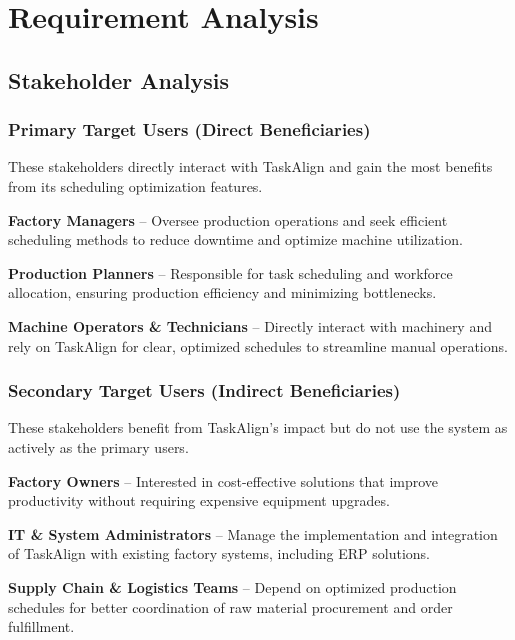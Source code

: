 \chapter{Requirement Analysis}
\label{chap:requirement-analysis}

\section{Stakeholder Analysis}
\label{section:stakeholder-analysis}


\subsection{Primary Target Users (Direct Beneficiaries)}
These stakeholders directly interact with TaskAlign and gain the most benefits from its scheduling optimization features.

\textbf{Factory Managers} – Oversee production operations and seek efficient scheduling methods to reduce downtime and optimize machine utilization.

\textbf{Production Planners} – Responsible for task scheduling and workforce allocation, ensuring production efficiency and minimizing bottlenecks.

\textbf{Machine Operators \& Technicians} – Directly interact with machinery and rely on TaskAlign for clear, optimized schedules to streamline manual operations.

\subsection{Secondary Target Users (Indirect Beneficiaries)}
These stakeholders benefit from TaskAlign’s impact but do not use the system as actively as the primary users.

\textbf{Factory Owners} – Interested in cost-effective solutions that improve productivity without requiring expensive equipment upgrades.

\textbf{IT \& System Administrators} – Manage the implementation and integration of TaskAlign with existing factory systems, including ERP solutions.

\textbf{Supply Chain \& Logistics Teams} – Depend on optimized production schedules for better coordination of raw material procurement and order fulfillment.

